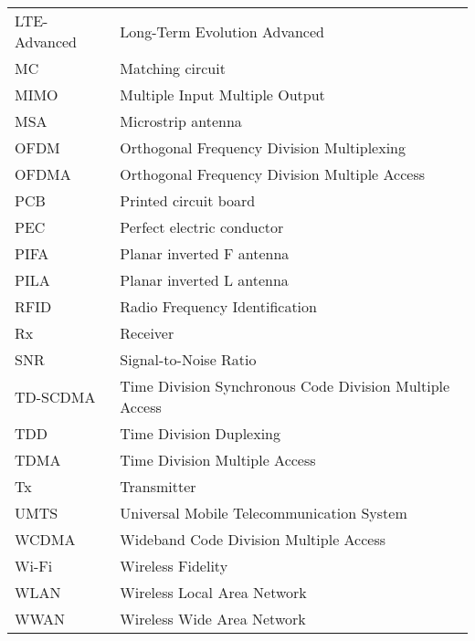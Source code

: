 \begin{tabular}{ll}
LTE-Advanced & Long-Term Evolution Advanced\\
MC          & Matching circuit\\
MIMO        & Multiple Input Multiple Output \\
MSA         & Microstrip antenna\\
OFDM        & Orthogonal Frequency Division Multiplexing \\
OFDMA       & Orthogonal Frequency Division Multiple Access\\
PCB         & Printed circuit board\\
PEC         & Perfect electric conductor\\
PIFA        & Planar inverted F antenna\\
PILA        & Planar inverted L antenna\\
RFID        & Radio Frequency Identification \\
Rx          & Receiver \\
SNR         & Signal-to-Noise Ratio \\
TD-SCDMA    & Time Division Synchronous Code Division Multiple Access \\
TDD         & Time Division Duplexing \\
TDMA        & Time Division Multiple Access \\
Tx          & Transmitter \\
UMTS        & Universal Mobile Telecommunication System \\
WCDMA       & Wideband Code Division Multiple Access \\
Wi-Fi       & Wireless Fidelity \\
WLAN        & Wireless Local Area Network \\
WWAN        & Wireless Wide Area Network\\
\end{tabular}
